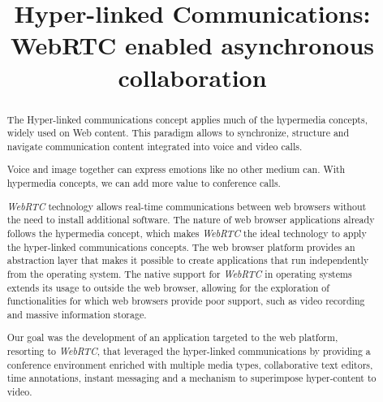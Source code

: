 \documentclass[conference,compsoc,a4paper]{IEEEtran}
\begin{document}
\title{Hyper-linked Communications: WebRTC enabled asynchronous collaboration}

\author{
\and
{}
}

\maketitle

\begin{abstract}
The Hyper-linked communications concept applies much of the hypermedia concepts, widely used on Web content. This paradigm allows to synchronize, structure and navigate communication content integrated into voice and video calls.

Voice and image together can express emotions like no other medium can. With hypermedia concepts, we can add more value to conference calls.

\emph{WebRTC} technology allows real-time communications between web browsers without the need to install additional software. The nature of web browser applications already follows the hypermedia concept, which makes \emph{WebRTC} the ideal technology to apply the hyper-linked communications concepts.
The web browser platform provides an abstraction layer that makes it possible to create applications that run independently from the operating system.
The native support for \emph{WebRTC} in operating systems extends its usage to outside the web browser, allowing for the exploration of functionalities for which web browsers provide poor support, such as video recording and massive information storage.

Our goal was the development of an application targeted to the web platform, resorting to \emph{WebRTC}, that leveraged the hyper-linked communications by providing a conference environment enriched with multiple media types, collaborative text editors, time annotations, instant messaging and a mechanism to superimpose hyper-content to video.
\end{abstract}
\end{document}
